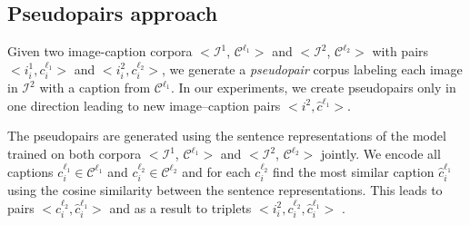 \subsection{Pseudopairs approach}\label{sec:method:pseudo}

\begin{comment}
Given two corpora $\mathcal{D}_1$ and $\mathcal{D}_2$, where $\mathcal{D}_1$ contains $<i_1, c_1>$ and $<i_2, c_2>$ pairs, and $\mathcal{D}_2$ contains $<i_2, c_1>$ pairs, we generate a \emph{pseudo-pair} corpora with noisy image-sentence pairs extracted from $D_1$. %
In this paper, we create pseudo-pairs
in one direction $\mathcal{D}_1 \rightarrow \mathcal{D}_2$ leading 
to new image--caption pairs $<i_2, \hat{c}_2>$ for $\mathcal{D}_2$. 
We generate these pseudo-pairs using the cosine similarity between
sentence embeddings using a model trained on the $\mathcal{D}_1$ data. 
When generating 
pseudo-pairs $\mathcal{D}_1 \rightarrow \mathcal{D}_2$, we encode all 
captions $c_1 \in \mathcal{D}_2$ using the model trained on $\mathcal{D}_1$, and transfer the most similar $\hat{c}_2$ caption 
from $\mathcal{D}_1$ as its pair. This leads to $<c_2, c_1>$ pairs, and as a consequence to $<i_2, \hat{c}_2>$ pairs, and ultimately in a $\mathcal{D}_2$ corpus that contains $<i_1, c_1>$ and $<i_2, \hat{c_2}>$ pairs.
\end{comment}

Given two image-caption corpora  $<\mathcal{I}^1$, $\mathcal{C}^{\ell_1}>$  and  $<\mathcal{I}^2$, $\mathcal{C}^{\ell_2}>$ with pairs 
$<i^1_i, c^{\ell_1}_i>$ and $<i^2_i, c^{\ell_2}_i>$, we generate a \emph{pseudopair} corpus labeling each image in $\mathcal{I}^2$ with 
a caption from $\mathcal{C}^{\ell_1}$.
In our experiments, we create pseudopairs
only in one direction  leading 
to new image--caption pairs $<i^2, \hat{c}^{\ell_1}>$. 

The pseudopairs are generated using the sentence representations of
the model trained on both corpora  $<\mathcal{I}^1$, $\mathcal{C}^{\ell_1}>$
and $<\mathcal{I}^2$, $\mathcal{C}^{\ell_2}>$ jointly. 
We encode all 
captions $c^{\ell_1}_i \in \mathcal{C}^{\ell_1}$ and 
 $c^{\ell_2}_i \in \mathcal{C}^{\ell_2}$ and for each $c^{\ell_2}_i$
find the most similar caption $\hat{c}^{\ell_1}_i$ using the cosine similarity between the sentence representations.
This leads to pairs $<c^{\ell_2}_i, \hat{c}^{\ell_1}_i>$ 
and as a result to triplets $<i^2_i, c^{\ell_2}_i, \hat{c}^{\ell_1}_i>$ .




